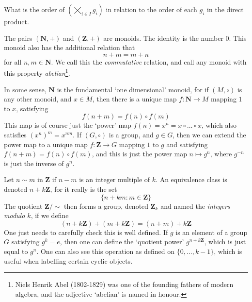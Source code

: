 \clearpage

\begin{exercise}
    What is the order of $(\bigtimes_{i \in I} g_i)$ in relation to the order of each $g_i$ in the direct product.
\end{exercise}




















\begin{example}
    The pairs  $(\mathbf{N}, +)$ and $(\mathbf{Z}, +)$ are monoids. The identity is the number $0$. This monoid also has the additional relation that
    \[ n + m = m + n \]
    for all $n,m \in \mathbf{N}$. We call this the \emph{commutative} relation, and call any monoid with this property \emph{abelian}\footnote{Niels Henrik Abel (1802-1829) was one of the founding fathers of modern algebra, and the adjective `abelian' is named in honour.}.
\end{example}

In some sense, $\mathbf{N}$ is the fundamental `one dimensional' monoid, for if $(M, \circ)$ is any other monoid, and $x \in M$, then there is a unique map $f: \mathbf{N} \to M$ mapping $1$ to $x$, satisfying
%
\[ f(n + m) = f(n) \circ f(m) \]
%
This map is of course just the `power' map $f(n) = x^n = x \circ \dots \circ x$, which also satisfies $(x^n)^m = x^{nm}$. If $(G, \circ)$ is a group, and $g \in G$, then we can extend the power map to a unique map $f: \mathbf{Z} \to G$ mapping $1$ to $g$ and satisfying $f(n + m) = f(n) \circ f(m)$, and this is just the power map $n \mapsto g^n$, where $g^{-n}$ is just the inverse of $g^n$.

\begin{example}
    Let $n \sim m$ in $\mathbf{Z}$ if $n - m$ is an integer multiple of $k$. An equivalence class is denoted $n + k \mathbf{Z}$, for it really is the set
    \[ \{ n + k m : m \in \mathbf{Z} \} \]
    The quotient $\mathbf{Z} / {\sim}$ then forms a group, denoted $\mathbf{Z}_k$ and named the \emph{integers modulo $k$}, if we define
    \[ (n + k \mathbf{Z}) + (m + k \mathbf{Z}) = (n + m) + k \mathbf{Z} \]
    One just needs to carefully check this is well defined. If $g$ is an element of a group $G$ satisfying $g^k = e$, then one can define the `quotient power' $g^{n + k \mathbf{Z}}$, which is just equal to $g^n$. One can also see this operation as defined on $\{ 0, \dots, k-1 \}$, which is useful when labelling certain cyclic objects.
\end{example}

